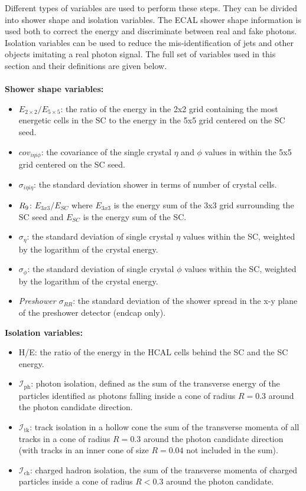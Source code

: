 Different types of variables are used to perform these steps.
They can be divided into shower shape and isolation variables.
The ECAL shower shape information is used both to correct the energy and discriminate between real and fake photons.
Isolation variables can be used to reduce the mis-identification of jets and other objects imitating a real photon signal.
The full set of variables used in this section and their definitions are given below.
\\ \\
\textbf{Shower shape variables:}
\begin{itemize}[noitemsep]
\item \emph{$E_{2\times2}/E_{5\times5}$}: the ratio of the energy in the 2x2 grid
  containing the most energetic cells in the SC to the energy in
  the 5x5 grid centered on the SC seed.
\item \emph{$cov_{i\eta i\phi}$}: the covariance of the single crystal $\eta$
  and $\phi$ values in within the 5x5 grid centered on the
  SC seed.
\item \emph{$\sigma_{i\eta i\eta}$}: the standard deviation 
  shower in terms of number of crystal cells. 
\item \emph{$R_9$}: $E_{3x3}/E_{SC}$ where $E_{3x3}$ is the energy sum of the
  3x3 grid surrounding the SC seed and $E_{SC}$ is the energy sum of the SC. 
\item \emph{$\sigma_{\eta}$}: the standard deviation
  of single crystal $\eta$ values within the SC, weighted by the logarithm of the crystal energy.
\item \emph{$\sigma_{\phi}$}: the standard deviation
  of single crystal $\phi$ values within the SC, weighted by the logarithm of the crystal energy.
\item \emph{Preshower $\sigma_{RR}$}: the standard deviation of the shower
  spread in the x-y plane of the preshower detector (endcap only).
\end{itemize}

\textbf{Isolation variables:}
\begin{itemize}[noitemsep]
\item H/E: the ratio of the energy in the HCAL cells behind the SC
  and the SC energy.
\item \emph{$\mathcal{I}_{\text{ph}}$}: 
  photon isolation,
  defined as the sum of the transverse energy of the particles
  identified as photons falling inside a cone of radius
  $R=0.3$
  around the photon candidate direction.
\item \emph{$\mathcal{I}_{\text{tk}}$}: 
  track isolation in a hollow cone
  the sum of the transverse momenta
  of all tracks in a cone of radius $R=0.3$
  around the photon candidate direction (with tracks in an
  inner cone of size $R=0.04$ not included in the sum).
\item \emph{$\mathcal{I}_{\text{ch}}$}: 
  charged hadron isolation,
  the sum of the transverse momenta of
  charged particles inside a cone of radius $R<0.3$ around the
  photon candidate.
\end{itemize}

